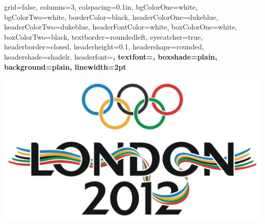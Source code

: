\documentclass[landscape, paperwidth=42in, paperheight=36in,
fontscale=.35, margin=1in]{baposter}
\begin{document}
\begin{poster}{ 
  grid=false,
  columns=3,
  colspacing=0.1in, 
  bgColorOne=white,
  bgColorTwo=white,
  borderColor=black,
  headerColorOne=dukeblue, %
  headerColorTwo=dukeblue, %
  headerFontColor=white,
  boxColorOne=white,
  boxColorTwo=black, %
  textborder=roundedleft,
  eyecatcher=true,
  headerborder=closed,
  headerheight=0.1\textheight,
  headershape=rounded, 
  headershade=shadelr,
  headerfont=\Large\bf\textsf, %
  textfont={\setlength{\parindent}{1.5em}},
  boxshade=plain,
  background=plain,
  linewidth=2pt
  } {%
	\hspace{1.0in} 
  \centering \includegraphics[scale=.6]{../graphics/london-2012-olympics-logo.jpg} \hspace{1in}

}
\end{poster}
\end{document}
